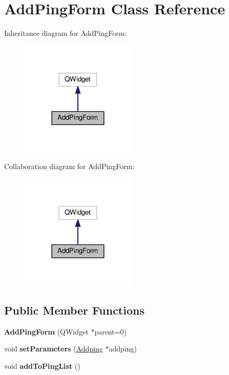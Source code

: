 \hypertarget{class_add_ping_form}{}\section{Add\+Ping\+Form Class Reference}
\label{class_add_ping_form}


Inheritance diagram for Add\+Ping\+Form\+:
\nopagebreak
\begin{figure}[H]
\begin{center}
\leavevmode
\includegraphics[width=156pt]{class_add_ping_form__inherit__graph}
\end{center}
\end{figure}


Collaboration diagram for Add\+Ping\+Form\+:
\nopagebreak
\begin{figure}[H]
\begin{center}
\leavevmode
\includegraphics[width=156pt]{class_add_ping_form__coll__graph}
\end{center}
\end{figure}
\subsection*{Public Member Functions}
\begin{DoxyCompactItemize}
\item 
{\bfseries Add\+Ping\+Form} (Q\+Widget $\ast$parent=0)\hypertarget{class_add_ping_form_ab602e336625dcff5c825755db0d5e8b6}{}\label{class_add_ping_form_ab602e336625dcff5c825755db0d5e8b6}

\item 
void {\bfseries set\+Parameters} (\hyperlink{class_addping}{Addping} $\ast$addping)\hypertarget{class_add_ping_form_a7aea79b177eb96abaa8d9521338c5a83}{}\label{class_add_ping_form_a7aea79b177eb96abaa8d9521338c5a83}

\item 
void {\bfseries add\+To\+Ping\+List} ()\hypertarget{class_add_ping_form_ab3ba29ade6646207bdd6f24b93ea01c4}{}\label{class_add_ping_form_ab3ba29ade6646207bdd6f24b93ea01c4}

\end{DoxyCompactItemize}
